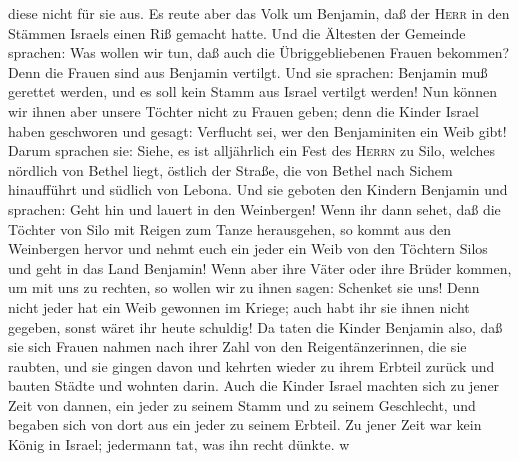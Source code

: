 diese nicht für sie aus.  Es reute aber das Volk um
Benjamin, daß der \textsc{Herr} in den Stämmen Israels einen Riß gemacht
hatte.  Und die Ältesten der Gemeinde sprachen: Was
wollen wir tun, daß auch die Übriggebliebenen Frauen bekommen? Denn die
Frauen sind aus Benjamin vertilgt.  Und sie sprachen:
Benjamin muß gerettet werden, und es soll kein Stamm aus Israel vertilgt
werden!  Nun können wir ihnen aber unsere Töchter nicht
zu Frauen geben; denn die Kinder Israel haben geschworen und gesagt:
Verflucht sei, wer den Benjaminiten ein Weib gibt!  Darum
sprachen sie: Siehe, es ist alljährlich ein Fest des \textsc{Herrn} zu
Silo, welches nördlich von Bethel liegt, östlich der Straße, die von
Bethel nach Sichem hinaufführt und südlich von Lebona. 
Und sie geboten den Kindern Benjamin und sprachen: Geht hin und lauert
in den Weinbergen!  Wenn ihr dann sehet, daß die Töchter
von Silo mit Reigen zum Tanze herausgehen, so kommt aus den Weinbergen
hervor und nehmt euch ein jeder ein Weib von den Töchtern Silos und geht
in das Land Benjamin!  Wenn aber ihre Väter oder ihre
Brüder kommen, um mit uns zu rechten, so wollen wir zu ihnen sagen:
Schenket sie uns! Denn nicht jeder hat ein Weib gewonnen im Kriege; auch
habt ihr sie ihnen nicht gegeben, sonst wäret ihr heute schuldig!
 Da taten die Kinder Benjamin also, daß sie sich Frauen
nahmen nach ihrer Zahl von den Reigentänzerinnen, die sie raubten, und
sie gingen davon und kehrten wieder zu ihrem Erbteil zurück und bauten
Städte und wohnten darin.  Auch die Kinder Israel machten
sich zu jener Zeit von dannen, ein jeder zu seinem Stamm und zu seinem
Geschlecht, und begaben sich von dort aus ein jeder zu seinem Erbteil.
 Zu jener Zeit war kein König in Israel; jedermann tat,
was ihn recht dünkte. w
